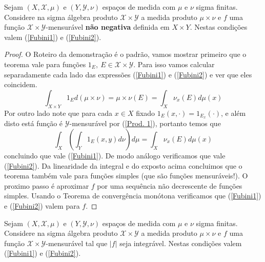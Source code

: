 \begin{teorema}[Tonelli]\label{Tonelli}
Sejam $(X, \mathscr{X}, \mu)$ e $(Y, \mathscr{Y}, \nu)$
 espaços de medida com $\mu$ e $\nu$ sigma finitas. Considere na sigma álgebra
 produto $\mathscr{X}\times \mathscr{Y}$ a medida produto $\mu\times \nu$ e $f$ uma função $\mathscr{X}\times \mathscr{Y}$-mensurável \textbf{não negativa} definida em $X\times Y$. Nestas condições valem (\ref{Fubini1}) e (\ref{Fubini2}). 
\end{teorema}


\begin{proof}
O Roteiro da demonstração é o padrão, vamos mostrar primeiro que o teorema vale para funções $1_E,~E\in \mathscr{X}\times \mathscr{Y}$. Para isso vamos calcular separadamente cada lado das expressões (\ref{Fubini1}) e (\ref{Fubini2}) e ver que eles coincidem.
\begin{equation}
\int_{X\times Y} 1_E d(\mu\times \nu)=\mu\times \nu( E)=\int_X \nu_x(E) d\mu(x)
\end{equation}
Por outro lado note que para cada $x\in X$ fixado $1_E(x,\cdot)=1_{E_x}(\cdot)$, e além disto está função é $\mathscr{Y}$-mensurável por (\ref{Prod. 1}),  portanto temos que 
\begin{equation}
\int_X(\int_Y 1_E(x,y) d\nu)d\mu= \int_X \nu_x(E) d\mu(x)
\end{equation}
concluindo que vale (\ref{Fubini1}). De modo análogo verificamos que vale (\ref{Fubini2}). Da linearidade da integral e do exposto acima 
concluimos que o teorema também vale para funções simples (que são funções mensuráveis!). O proximo passo é aproximar $f$ por uma sequência
não decrescente de funções simples. Usando o Teorema de convergência monótona verificamos que  (\ref{Fubini1}) e (\ref{Fubini2}) valem para $f$.
\end{proof}




\begin{corolario}[Fubini]
Sejam $(X, \mathscr{X}, \mu)$ e $(Y, \mathscr{Y}, \nu)$
espaços de medida com $\mu$ e $\nu$ sigma finitas. Considere na sigma álgebra
produto $\mathscr{X}\times \mathscr{Y}$ a medida produto $\mu\times \nu$ e $f$ uma função $\mathscr{X}\times \mathscr{Y}$-mensurável tal que 
$|f|$ seja integrável. Nestas condições valem (\ref{Fubini1}) e (\ref{Fubini2}). 
\end{corolario}

